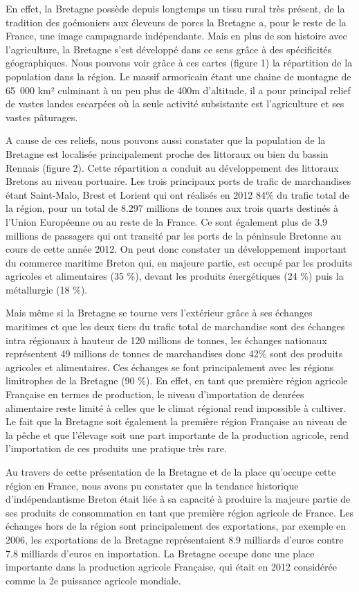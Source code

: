 \documentclass[a4paper,10pt]{report}
\begin{document}
			En effet, la Bretagne possède depuis longtemps un tissu rural très présent, de la tradition des goémoniers aux éleveurs de porcs la Bretagne a, pour le reste de la France, une image campagnarde indépendante. Mais en plus de son histoire avec l’agriculture, la Bretagne s’est développé dans ce sens grâce à des spécificités géographiques. Nous pouvons voir grâce à ces cartes (figure 1) la répartition de la population dans la région. Le massif armoricain étant une chaine de montagne de 65 000 km² culminant à un peu plus de 400m d’altitude, il a pour principal relief de vastes landes escarpées où la seule activité subsistante est l’agriculture et ses vastes pâturages.
	
			A cause de ces reliefs, nous pouvons aussi constater que la population de la Bretagne est localisée principalement proche des littoraux ou bien du bassin Rennais (figure 2). Cette répartition a conduit au développement des littoraux Bretons au niveau portuaire. Les trois principaux ports de trafic de marchandises étant Saint-Malo, Brest et Lorient qui ont réalisés en 2012 84\% du trafic total de la région, pour un total de 8.297 millions de tonnes aux trois quarts destinés à l’Union Européenne ou au reste de la France. Ce sont également plus de 3.9 millions de passagers qui ont  transité par les ports de la péninsule Bretonne au cours de cette année 2012. On peut donc constater un développement important du commerce maritime Breton qui, en majeure partie, est occupé par les produits agricoles et alimentaires (35 \%), devant les produits énergétiques (24 \%) puis la métallurgie (18 \%).
	
			Mais même si la Bretagne se tourne vers l’extérieur grâce à ses échanges maritimes et que les deux tiers du trafic total de marchandise sont des échanges intra régionaux à hauteur de 120 millions de tonnes, les échanges nationaux représentent 49 millions de tonnes de marchandises donc 42\% sont des produits agricoles et alimentaires. Ces échanges se font principalement avec les régions limitrophes de la Bretagne (90 \%). En effet, en tant que première région agricole Française en termes de production, le niveau d’importation de denrées alimentaire reste limité à celles que le climat régional rend impossible à cultiver. Le fait que la Bretagne soit également la première région Française au niveau de la pêche et que l’élevage soit une part importante de la production agricole, rend l’importation de ces produits une pratique très rare.
	
			Au travers de cette présentation de la Bretagne et de la place qu’occupe cette région en France, nous avons pu constater que la tendance historique d’indépendantisme Breton était liée à sa capacité à produire la majeure partie de ses produits de consommation en tant que première région agricole de France. Les échanges hors de la région sont principalement des exportations, par exemple en 2006, les exportations de la Bretagne représentaient 8.9 milliards d’euros contre 7.8 milliards d’euros en importation. La Bretagne occupe donc une place importante dans la production agricole Française, qui était en 2012 considérée comme la 2e puissance agricole mondiale.
	
\end{document}
